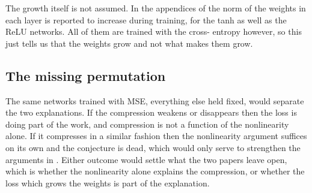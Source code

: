 The growth itself is not assumed. In the appendices of \cite{saxe2018} the
norm of the weights in each layer is reported to increase during training, for
the tanh as well as the ReLU networks. All of them are trained with the cross-
entropy however, so this just tells us that the weights grow and not what
makes them grow.

\subsection{The missing permutation}
The same networks trained with MSE, everything else held fixed, would separate
the two explanations. If the compression weakens or disappears then the loss
is doing part of the work, and compression is not a function of the
nonlinearity alone. If it compresses in a similar fashion then the
nonlinearity argument suffices on its own and the conjecture is dead, which
would only serve to strengthen the arguments in \cite{saxe2018}. Either
outcome would settle what the two papers leave open, which is whether the
nonlinearity alone explains the compression, or whether the loss which grows
the weights is part of the explanation.
